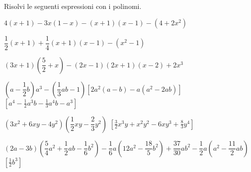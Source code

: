 \begin{esercizio}
\label{ese:10.25}
Risolvi le seguenti espressioni con i polinomi.
 \begin{enumeratea}
 \item $4(x+1)-3x(1-x)-(x+1)(x-1)-\left(4+2x^{2}\right)$
 \item $\dfrac{1}{2}(x+1)+\dfrac{1}{4}(x+1)(x-1)-\left(x^{2}-1\right)$
 \item $(3x+1)\left(\dfrac{5}{2}+x\right)-(2x-1)(2x+1)(x-2)+2x^{3}$
 \item $\left(a-\dfrac{1}{2}b\right)a^{3}-\left(\dfrac{1}{3}{ab}-1\right)
 \left[2a^{2}(a-b)-a\left(a^{2}-2{ab}\right)\right]$
  \hfill $\left[a^{4}-\frac{1}{2}a^{3}b-\frac{1}{3}a^{4}b-a^{3}\right]$
 \item $\left(3x^2+6xy-4y^2\right)\left(\dfrac{1}{2}xy-\dfrac{2}{3}y^2\right)$
  \hfill $\left[\frac{3}{2}x^{3}y+x^{2}y^{2}-6{xy}^{3}+\frac{8}{3}y^{4}\right]$
 \item $(2a-3b)\left(\dfrac{5}{4}a^{2}+\dfrac{1}{2}{ab}-
        \dfrac{1}{6}b^{2}\right)-\dfrac{1}{6}a\left(12a^{2}-
        \dfrac{18}{5}b^{2}\right)+\dfrac{37}{30}ab^{2}-
        \dfrac{1}{2}a\left(a^{2}-\dfrac{11}{2}{ab}\right)$
  \hfill $\left[\frac{1}{2}b^{3}\right]$
 \end{enumeratea}
\end{esercizio}

